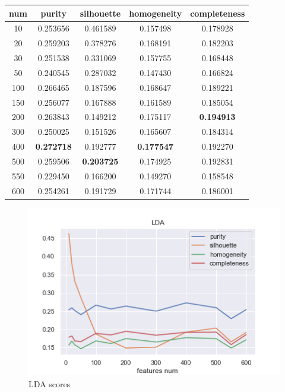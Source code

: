 \documentclass[11pt]{article}
\begin{document}
\begin{center}
\begin{tabular}{ |c|c|c|c|c| }
\hline
num & purity  & silhouette  & homogeneity  & completeness \\ \hline 
10  & 0.253656  & 0.461589  & 0.157498  & 0.178928  \\ \hline 
20  & 0.259203  & 0.378276  & 0.168191  & 0.182203  \\ \hline 
30  & 0.251538  & 0.331069  & 0.157755  & 0.168448  \\ \hline 
50  & 0.240545  & 0.287032  & 0.147430  & 0.166824  \\ \hline 
100  & 0.266465  & 0.187596  & 0.168647  & 0.189221 \\ \hline 
150  & 0.256077  & 0.167888  & 0.161589  & 0.185054 \\ \hline 
200  & 0.263843  & 0.149212  & 0.175117  & \textbf{0.194913} \\ \hline 
300  & 0.250025  & 0.151526  & 0.165607  & 0.184314 \\ \hline 
400  & \textbf{0.272718}  & 0.192777  & \textbf{0.177547}  & 0.192270 \\ \hline 
500  & 0.259506  & \textbf{0.203725}  & 0.174925  & 0.192831 \\ \hline 
550  & 0.229450  & 0.166200  & 0.149270  & 0.158548 \\ \hline 
600  & 0.254261  & 0.191729  & 0.171744  & 0.186001 \\
\hline 
\end{tabular}
\end{center}
\FloatBarrier

\begin{figure}[h]
 	\centering
 	\includegraphics[scale=0.7]{lda_scores.png}
	\caption{LDA scores}
\label{lda_scores}
\end{figure}
\FloatBarrier
\end{document}
